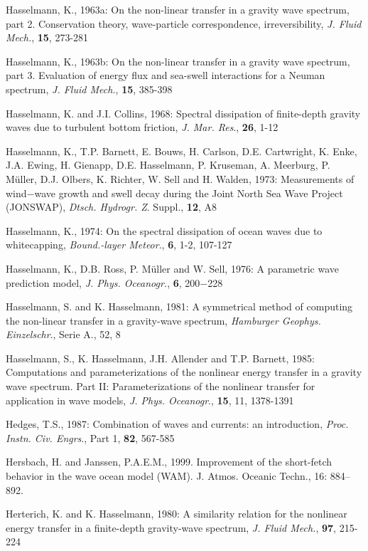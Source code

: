 \documentclass[12pt]{book}
\begin{document}
\begin{thebibliography}{10}
Hasselmann, K., 1963a: On the non-linear transfer in a gravity wave spectrum, part 2. {C}onservation theory,
wave-particle correspondence, irreversibility,
{\it J. Fluid Mech.}, {\bf 15}, 273-281

Hasselmann, K., 1963b: On the non-linear transfer in a gravity wave spectrum, part 3. {E}valuation of energy
flux and sea-swell interactions for a {N}euman spectrum,
{\it J. Fluid Mech.}, {\bf 15}, 385-398

Hasselmann, K. and J.I. Collins, 1968: Spectral dissipation of finite-depth gravity waves due to turbulent
bottom friction, {\it J. Mar. Res}., {\bf 26}, 1-12

Hasselmann, K., T.P. Barnett, E. Bouws, H. Carlson, D.E. Cartwright, K. Enke, J.A. Ewing, H. Gienapp,
D.E. Hasselmann, P. Kruseman, A. Meerburg, P. M\"{u}ller, D.J. Olbers, K. Richter, W. Sell and H.
Walden, 1973: Measurements of wind$-$wave growth and swell decay during the Joint North Sea
Wave Project (JONSWAP), {\it Dtsch. Hydrogr. Z}. Suppl., {\bf 12}, A8

Hasselmann, K., 1974: On the spectral dissipation of ocean waves due to whitecapping, {\it Bound.-layer
Meteor}., {\bf 6}, 1-2, 107-127

Hasselmann, K., D.B. Ross, P. M\"{u}ller and W. Sell, 1976: A parametric wave prediction  model, {\it J. Phys.
Oceanogr.}, {\bf 6}, 200$-$228

Hasselmann, S. and K. Hasselmann, 1981: A symmetrical method of computing the non-linear transfer
in a gravity-wave spectrum, {\it Hamburger Geophys. Einzelschr}., Serie A., 52, 8

Hasselmann, S., K. Hasselmann, J.H. Allender and T.P. Barnett, 1985: Computations and
parameterizations of the nonlinear energy transfer in a gravity wave spectrum. Part II:
Parameterizations of the nonlinear transfer for application in wave models, {\it J. Phys. Oceanogr}.,
{\bf 15}, 11, 1378-1391

Hedges, T.S., 1987: Combination of waves and currents: an introduction, {\it Proc. Instn. Civ. Engrs}., Part 1,
{\bf 82}, 567-585

Hersbach, H. and Janssen, P.A.E.M., 1999. Improvement of the short-fetch behavior in the wave ocean
model ({WAM}). J. Atmos. Oceanic Techn., 16: 884--892.

Herterich, K. and K. Hasselmann, 1980: A similarity relation for the nonlinear energy transfer in a
finite-depth gravity-wave spectrum, {\it J. Fluid Mech.}, {\bf 97}, 215-224


\end{thebibliography}
\end{document}
